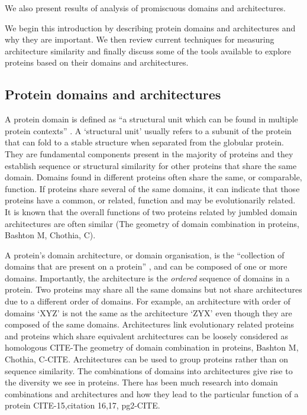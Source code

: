 We also present results of analysis of promiscuous domains and architectures.

We begin this introduction by describing protein domains and architectures and why they are important. We then review current techniques for measuring architecture similarity and finally discuss some of the tools available to explore proteins based on their domains and architectures.



\subsection{Protein domains and architectures}
A protein domain is defined as ``a structural unit which can be found in multiple protein contexts'' \cite{pfamdb}. A `structural unit' usually refers to a subunit of the protein that can fold to a stable structure when separated from the globular protein. They are fundamental components present in the majority of proteins and they establish sequence or structural similarity for other proteins that share the same domain. Domains found in different proteins often share the same, or comparable, function. If proteins share several of the same domains, it can indicate that those proteins have a common, or related, function and may be evolutionarily related. It is known that the overall functions of two proteins related by jumbled domain architectures are often similar (The geometry of domain combination in proteins, Bashton M, Chothia, C).

A protein's domain architecture, or domain organisation, is the ``collection of domains that are present on a protein'' \cite{pfamdb}, and can be composed of one or more domains. Importantly, the architecture is the \textit{ordered} sequence of domains in a protein. Two proteins may share all the same domains but not share architectures due to a different order of domains. For example, an architecture with order of domains `XYZ' is not the same as the architecture `ZYX' even though they are composed of the same domains. Architectures link evolutionary related proteins \cite{fong} and proteins which share equivalent architectures can be loosely considered as homologous CITE-The geometry of domain combination in proteins, Bashton M, Chothia, C-CITE. Architectures can be used to group proteins rather than on sequence similarity. The combinations of domains into architectures give rise to the diversity we see in proteins. There has been much research into domain combinations and architectures and how they  lead to the particular function of a protein CITE-15,citation 16,17, pg2-CITE.   

